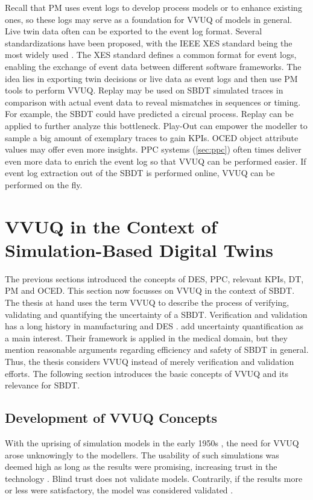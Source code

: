 Recall that PM uses event logs to develop process models or to enhance existing ones, so these logs may serve as a foundation for VVUQ of models in general. Live twin data often can be exported to the event log format. Several standardizations have been proposed, with the IEEE XES standard being the most widely used \autocite{van2016data}. The XES standard defines a common format for event logs, enabling the exchange of event data between different software frameworks. The idea lies in exporting twin decisions or live data as event logs and then use PM tools to perform VVUQ.
Replay may be used on SBDT simulated traces in comparison with actual event data to reveal mismatches in sequences or timing. For example, the SBDT could have predicted a circual process. Replay can be applied to further analyze this bottleneck. Play-Out can empower the modeller to sample a big amount of exemplary traces to gain KPIs. OCED object attribute values may offer even more insights.
PPC systems (\autoref{sec:ppc}) often times deliver even more data to enrich the event log so that VVUQ can be performed easier. If event log extraction out of the SBDT is performed online, VVUQ can be performed on the fly.

\section{VVUQ in the Context of Simulation-Based Digital Twins}
\label{sec:vvuq-sbdt}

The previous sections introduced the concepts of DES, PPC, relevant KPIs, DT, PM and OCED. This section now focusses on VVUQ in the context of SBDT. The thesis at hand uses the term VVUQ to describe the process of verifying, validating and quantifying the uncertainty of a SBDT. Verification and validation has a long history in manufacturing and DES \autocite{Bitencourt2023}. \Autocite{sel2025survey} add uncertainty quantification as a main interest. Their framework is applied in the medical domain, but they mention reasonable arguments regarding efficiency and safety of SBDT in general. Thus, the thesis considers VVUQ instead of merely verification and validation efforts. The following section introduces the basic concepts of VVUQ and its relevance for SBDT.


\subsection{Development of VVUQ Concepts}
\label{sec:historical-development}
With the uprising of simulation models in the early 1950s \autocite{evans1967simulation}, the need for VVUQ arose unknowingly to the modellers. The usability of such simulations was deemed high as long as the results were promising, increasing trust in the technology \autocite{durst2017historical}. Blind trust does not validate models. Contrarily, if the results more or less were satisfactory, the model was considered validated \autocite{bonani2003physics}.

